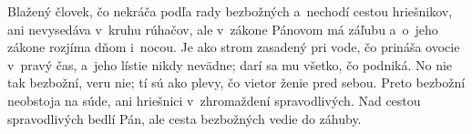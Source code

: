 Blažený človek, čo nekráča podľa rady bezbožných
a~nechodí cestou hriešnikov,
ani nevysedáva v~kruhu rúhačov,
\versseparator
ale v~zákone Pánovom má záľubu
a~o~jeho zákone rozjíma dňom i~nocou.
\versseparator
Je ako strom zasadený pri vode,
čo prináša ovocie v~pravý čas,
\versseparator
a~jeho lístie nikdy nevädne;
darí sa mu všetko, čo podniká.
\versseparator
No nie tak bezbožní, veru nie;
tí sú ako plevy, čo vietor ženie pred sebou.
\versseparator
Preto bezbožní neobstoja na súde,
ani hriešnici v~zhromaždení spravodlivých.
\versseparator
Nad cestou spravodlivých bedlí Pán,
ale cesta bezbožných vedie do záhuby. 
